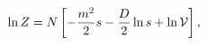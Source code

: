 \begin{equation}
   \ln Z = N \left[ - \frac{m^2}{2} s- \frac{D}{2} \ln s   + \ln {\cal V} \right],
   \label{10}
   \end{equation}

